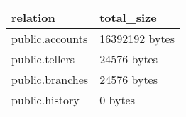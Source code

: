 \begin{tabular}{ll}
\rowcolor{heading}
\color{white}\textbf{relation} &
\color{white}\textbf{total\_size}\\
\hline

public.accounts & 16392192 bytes\\
public.tellers &  24576 bytes\\
public.branches & 24576 bytes\\
public.history & 0 bytes\\

\hline
\end{tabular}
